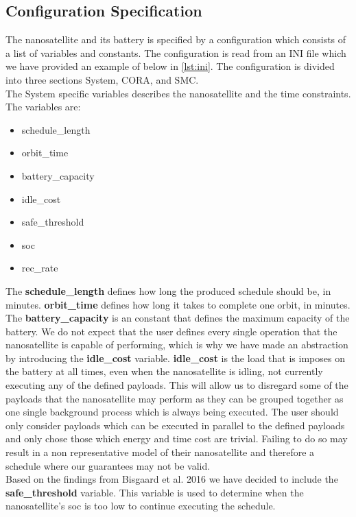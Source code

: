 \subsection{Configuration Specification} \label{subsec:init}
The nanosatellite and its battery is specified by a configuration which consists of a list of variables and constants. The configuration is read from an INI file which we have provided an example of below in \cref{lst:ini}.
The configuration is divided into three sections System, CORA, and SMC.\\
The System specific variables describes the nanosatellite and the time constraints.
The variables are:
\begin{itemize}
	\item schedule\_length
	\item orbit\_time
	\item battery\_capacity
	\item idle\_cost
	\item safe\_threshold
	\item soc
	\item rec\_rate
\end{itemize}
The \textbf{schedule\_length} defines how long the produced schedule should be, in minutes. 
\textbf{orbit\_time} defines how long it takes to complete one orbit, in minutes. 
The \textbf{battery\_capacity} is an constant that defines the maximum capacity of the battery. We do not expect that the user defines every single operation that the nanosatellite is capable of performing, which is why we have made an abstraction by introducing the \textbf{idle\_cost} variable. 
\textbf{idle\_cost} is the load that is imposes on the battery at all times, even when the nanosatellite is idling, not currently executing any of the defined payloads.
This will allow us to disregard some of the payloads that the nanosatellite may perform as they can be grouped together as one single background process which is always being executed.
The user should only consider payloads which can be executed in parallel to the defined payloads and only chose those which energy and time cost are trivial.
Failing to do so may result in a non representative model of their nanosatellite and therefore a schedule where our guarantees may not be valid.\\
Based on the findings from Bisgaard et al. 2016\cite{gomx3} we have decided to include the \textbf{safe\_threshold} variable.
This variable is used to determine when the nanosatellite's \gls{soc} is too low to continue executing the schedule.

